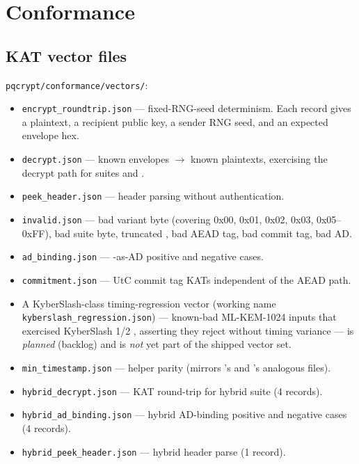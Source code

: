 \section{Conformance}
\label{sec:conformance}

\subsection{KAT vector files}

\texttt{pqcrypt/conformance/vectors/}:

\begin{itemize}
\item \texttt{encrypt\_roundtrip.json} --- fixed-RNG-seed determinism. Each record gives a plaintext, a recipient public key, a sender RNG seed, and an expected envelope hex.
\item \texttt{decrypt.json} --- known envelopes $\to$ known plaintexts, exercising the decrypt path for suites  and .
\item \texttt{peek\_header.json} --- header parsing without authentication.
\item \texttt{invalid.json} --- bad variant byte (covering 0x00, 0x01, 0x02, 0x03, 0x05--0xFF), bad suite byte, truncated , bad AEAD tag, bad commit tag, bad AD.
\item \texttt{ad\_binding.json} --- \pqid{}-as-AD positive and negative cases.
\item \texttt{commitment.json} --- UtC commit tag KATs independent of the AEAD path.
\item A KyberSlash-class timing-regression vector (working name \texttt{kyberslash\_regression.json}) --- known-bad ML-KEM-1024 inputs that exercised KyberSlash 1/2 \citep{kyberslash}, asserting they reject without timing variance --- is \emph{planned} (backlog) and is \emph{not} yet part of the shipped vector set.
\item \texttt{min\_timestamp.json} ---  helper parity (mirrors \pqid{}'s and \pqhash{}'s analogous files).
\item \texttt{hybrid\_decrypt.json} --- KAT round-trip for hybrid suite  (4 records).
\item \texttt{hybrid\_ad\_binding.json} --- hybrid AD-binding positive and negative cases (4 records).
\item \texttt{hybrid\_peek\_header.json} --- hybrid header parse (1 record).
\end{itemize}

